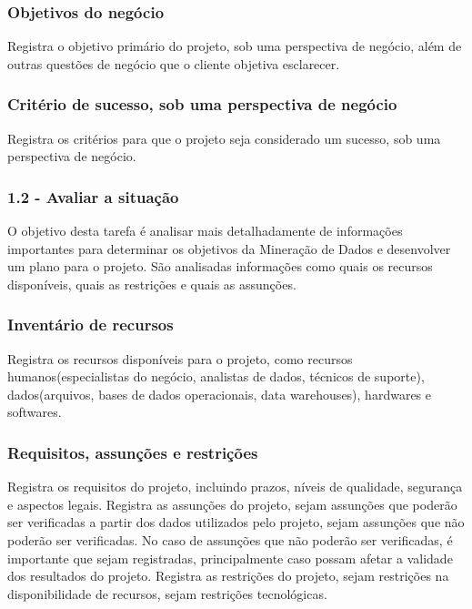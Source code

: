 \subsubsection*{Objetivos do negócio}

Registra o objetivo primário do projeto, sob uma perspectiva de negócio, além de outras questões de negócio que o cliente objetiva esclarecer.

\subsubsection*{Critério de sucesso, sob uma perspectiva de negócio}

Registra os critérios para que o projeto seja considerado um sucesso, sob uma perspectiva de negócio.

\subsubsection*{\textbf{1.2 - Avaliar a situação}}

O objetivo desta tarefa é analisar mais detalhadamente de informações importantes para determinar os objetivos da Mineração de Dados e desenvolver um plano para o projeto. São analisadas informações como quais os recursos disponíveis, quais as restrições e quais as assunções.

\subsubsection*{Inventário de recursos}

Registra os recursos disponíveis para o projeto, como recursos humanos(especialistas do negócio, analistas de dados, técnicos de suporte), dados(arquivos, bases de dados operacionais, data warehouses), hardwares e softwares.

\subsubsection*{Requisitos, assunções e restrições}

Registra os requisitos do projeto, incluindo prazos, níveis de qualidade, segurança e aspectos legais.
Registra as assunções do projeto, sejam assunções que poderão ser verificadas a partir dos dados utilizados pelo projeto, sejam assunções que não poderão ser verificadas. No caso de assunções que não poderão ser verificadas, é importante que sejam registradas, principalmente caso possam afetar a validade dos resultados do projeto.
Registra as restrições do projeto, sejam restrições na disponibilidade de recursos, sejam restrições tecnológicas.

